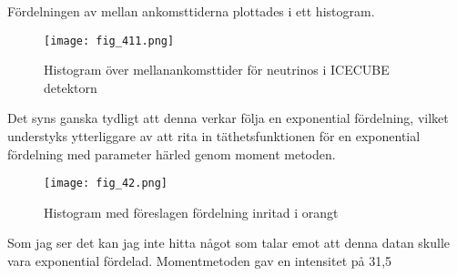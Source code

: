 \documentclass[a4paper]{article}
\begin{document}
Fördelningen av mellan ankomsttiderna plottades i ett histogram. 

\begin{figure}[H]
    \begin{small}
        \begin{center}
            \texttt{[image: fig\_411.png]}
        \end{center}
        \caption{Histogram över mellanankomsttider för neutrinos i ICECUBE detektorn}
        \label{fig:tids fördelning}
    \end{small}
\end{figure}

Det syns ganska tydligt att denna verkar följa en exponential fördelning, vilket understyks ytterliggare av att rita in täthetsfunktionen för en exponential fördelning med parameter härled genom moment metoden. 

\begin{figure}[H]
    \begin{small}
        \begin{center}
            \texttt{[image: fig\_42.png]}
        \end{center}
        \caption{Histogram med föreslagen fördelning inritad i orangt}
        \label{fig:fördelning sim}
    \end{small}
\end{figure}

Som jag ser det kan jag inte hitta något som talar emot att denna datan skulle vara exponential fördelad. Momentmetoden gav en intensitet på 31,5
\end{document}
